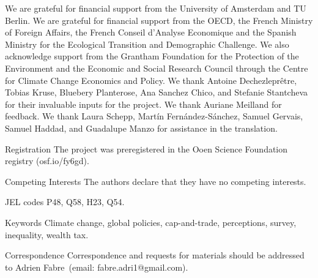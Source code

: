 \documentclass{nature}
\begin{document}
\begin{addendum} %
 \item We are grateful for financial support from the University of Amsterdam and TU Berlin. We are grateful for financial support from the OECD, the French Ministry of Foreign Affairs, the French Conseil d’Analyse Economique and the Spanish Ministry for the Ecological Transition and Demographic Challenge. We also acknowledge support from the Grantham Foundation for the Protection of the Environment and the Economic and Social Research Council through the Centre for Climate Change Economics and Policy. We thank Antoine Dechezleprêtre, Tobias Kruse, Bluebery Planterose, Ana Sanchez Chico, and Stefanie Stantcheva for their invaluable inputs for the project. We thank Auriane Meilland for feedback. We thank Laura Schepp, Martín Fernández-Sánchez, Samuel Gervais, Samuel Haddad, and Guadalupe Manzo for assistance in the translation. 
 \item[Registration] The project %
 was preregistered in the Ooen Science Foundation registry (osf.io/fy6gd).
 \item[Competing Interests] The authors declare that they have no
competing interests.
\item[JEL codes] P48, Q58, H23, Q54.
\item[Keywords] Climate change, global policies, cap-and-trade, perceptions, survey, inequality, wealth tax.
 \item[Correspondence] Correspondence and requests for materials
should be addressed to Adrien Fabre~(email: fabre.adri1@gmail.com).
\end{addendum}


\end{document}
